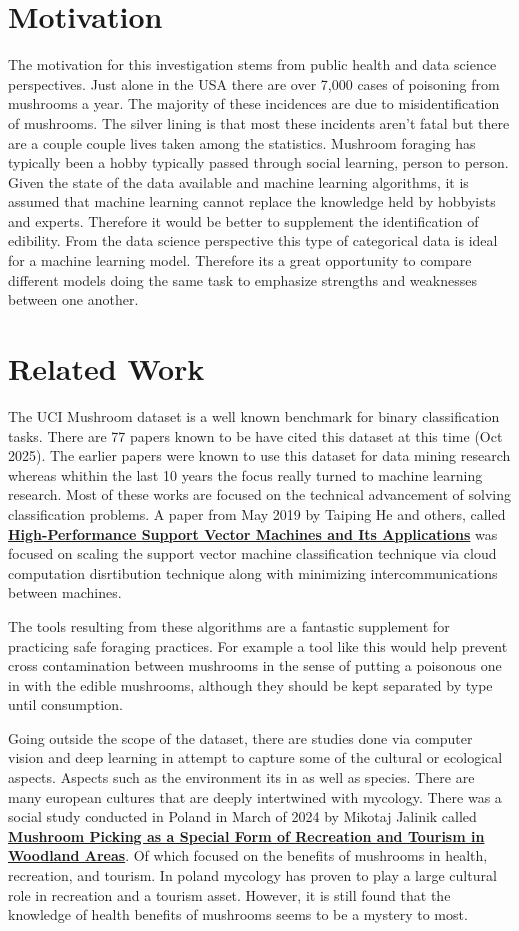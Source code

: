 \documentclass[conference]{IEEEtran}
\begin{document}
\section{Motivation}
    The motivation for this investigation stems from public health and data science perspectives. Just alone in the USA there are over 7,000 cases of poisoning from mushrooms a year. The majority of these incidences are due to misidentification of mushrooms. The silver lining is that most these incidents aren't fatal but there are a couple couple lives taken among the statistics. Mushroom foraging has typically been a hobby typically passed through social learning, person to person. Given the state of the data available and machine learning algorithms, it is assumed that machine learning cannot replace the knowledge held by hobbyists and experts. Therefore it would be better to supplement the identification of edibility. From the data science perspective this type of categorical data is ideal for a machine learning model. Therefore its a great opportunity to compare different models doing the same task to emphasize strengths and weaknesses between one another.

\section{Related Work}
    The UCI Mushroom dataset is a well known benchmark for binary classification tasks. There are 77 papers known to be have cited this dataset at this time (Oct 2025). The earlier papers were known to use this dataset for data mining research whereas whithin the last 10 years the focus really turned to machine learning research. Most of these works are focused on the technical advancement of solving classification problems. A paper from May 2019 by Taiping He and others, called \textbf{\uline{High-Performance Support Vector Machines and Its Applications}} was focused on scaling the support vector machine classification technique via cloud computation disrtibution technique along with minimizing intercommunications between machines. 

    The tools resulting from these algorithms are a fantastic supplement for practicing safe foraging practices. For example a tool like this would help prevent cross contamination between mushrooms in the sense of putting a poisonous one in with the edible mushrooms, although they should be kept separated by type until consumption.
    
    Going outside the scope of the dataset, there are studies done via computer vision and deep learning in attempt to capture some of the cultural or ecological aspects. Aspects such as the environment its in as well as species. There are many european cultures that are deeply intertwined with mycology. There was a social study conducted in Poland in March of 2024 by Mikotaj Jalinik called \textbf{\uline{Mushroom Picking as a Special Form of Recreation and Tourism in Woodland Areas}}. Of which focused on the benefits of mushrooms in health, recreation, and tourism. In poland mycology has proven to play a large cultural role in recreation and a tourism asset. However, it is still found that the knowledge of health benefits of mushrooms seems to be a mystery to most.
\end{document}
